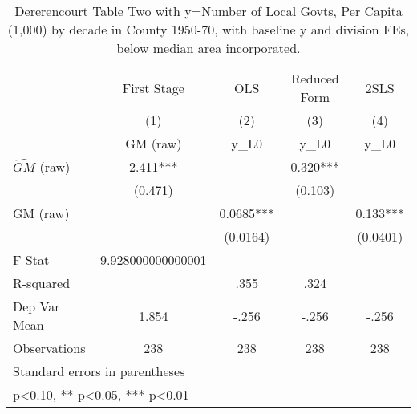 \begin{table}[htbp]\centering
\def\sym#1{\ifmmode^{#1}\else\(^{#1}\)\fi}
\caption{Dererencourt Table Two with y=Number of Local Govts, Per Capita (1,000) by decade in County 1950-70, with baseline y and division FEs, below median area incorporated.}
\begin{tabular}{l*{4}{c}}
\toprule
                    & First Stage   &         OLS   &Reduced Form   &        2SLS   \\
                    &\multicolumn{1}{c}{(1)}&\multicolumn{1}{c}{(2)}&\multicolumn{1}{c}{(3)}&\multicolumn{1}{c}{(4)}\\
                    &\multicolumn{1}{c}{GM  (raw)}&\multicolumn{1}{c}{y\_L0}&\multicolumn{1}{c}{y\_L0}&\multicolumn{1}{c}{y\_L0}\\
\midrule
$\hat{GM}$ (raw)    &       2.411***&               &       0.320***&               \\
                    &     (0.471)   &               &     (0.103)   &               \\
\addlinespace
GM  (raw)           &               &      0.0685***&               &       0.133***\\
                    &               &    (0.0164)   &               &    (0.0401)   \\
\midrule
F-Stat              &9.928000000000001   &               &               &               \\
R-squared           &               &        .355   &        .324   &               \\
Dep Var Mean        &       1.854   &       -.256   &       -.256   &       -.256   \\
Observations        &         238   &         238   &         238   &         238   \\
\bottomrule
\multicolumn{5}{l}{\footnotesize Standard errors in parentheses}\\
\multicolumn{5}{l}{\footnotesize * p<0.10, ** p<0.05, *** p<0.01}\\
\end{tabular}
\end{table}
